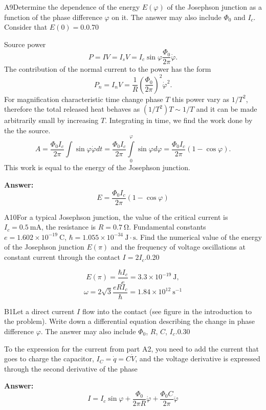\documentclass[11pt,a4paper]{article}
\begin{document}
\begin{solcard}{A9}{Determine the dependence of the energy $E(\varphi)$ of the Josephson junction as a function of the phase difference $\varphi$ on it. The answer may also include $\Phi_0$ and $I_c$. Consider that $E(0) = 0$.}{0.70}

Source power $$P = IV = I_s V = I_c \sin\varphi \dfrac{\Phi_0 }{2\pi} \dot{\varphi}.$$The contribution of the normal current to the power has the form $$ P_n = I_n V = \frac{1}{R} \left( \frac{\Phi_0}{2\pi}\right)^2 \dot{\varphi}^2. $$For magnification characteristic time change phase $T$ this power vary as $1/T^2$, therefore the total released heat behaves as $(1/T^2)T \sim 1/T$ and it can be made arbitrarily small by increasing $T$. Integrating in time, we find the work done by the the source. $$ A = \frac{\Phi_0 I_c}{2\pi} \int \sin \varphi \dot{\varphi} dt =  \frac{\Phi_0 I_c}{2\pi} \int\limits_{0}^{\varphi} \sin \varphi d \varphi =  \frac{\Phi_0 I_c}{2\pi} (1 - \cos \varphi). $$This work is equal to the energy of the Josephson junction.

\par\smallskip\noindent\textbf{Answer:} $$ E =  \frac{\Phi_0 I_c}{2\pi} (1 - \cos \varphi) $$
\end{solcard}

\begin{solcard}{A10}{For a typical Josephson junction, the value of the critical current is $I_c = 0.5~\mathrm{mA}$, the resistance is $R = 0.7 ~\mathrm{\Omega}$. Fundamental constants $e = 1.602 \times 10^{-19}~\mathrm{C}$, $\hbar = 1.055 \times 10^{-34}~\mathrm{J} \cdot \mathrm{s}$. Find the numerical value of the energy of the Josephson junction $E(\pi)$ and the frequency of voltage oscillations at constant current through the contact $I = 2 I_c$.}{0.20}

$$ E(\pi) = \frac{\hbar I_c}{e} = 3.3 \times 10^{-19}~\mathrm{J}, $$$$ \omega = 2 \sqrt{3} \frac{e R I_c}{\hbar} = 1.84 \times 10^{12}~\mathrm{s}^{-1} $$

\end{solcard}

\begin{solcard}{B1}{Let a direct current $I$ flow into the contact (see figure in the introduction to the problem). Write down a differential equation describing the change in phase difference $\varphi$. The answer may also include $\Phi_0$, $R$, $C$, $I_c$.}{0.30}

To the expression for the current from part A2, you need to add the current that goes to charge the capacitor, $I_C = \dot{q} = C \dot{V}$, and the voltage derivative is expressed through the second derivative of the phase

\par\smallskip\noindent\textbf{Answer:} $$ I = I_c \sin \varphi + \frac{\Phi_0}{2\pi R} \dot{\varphi} + \frac{\Phi_0 C}{2\pi} \ddot{\varphi} $$
\end{solcard}
\end{document}
